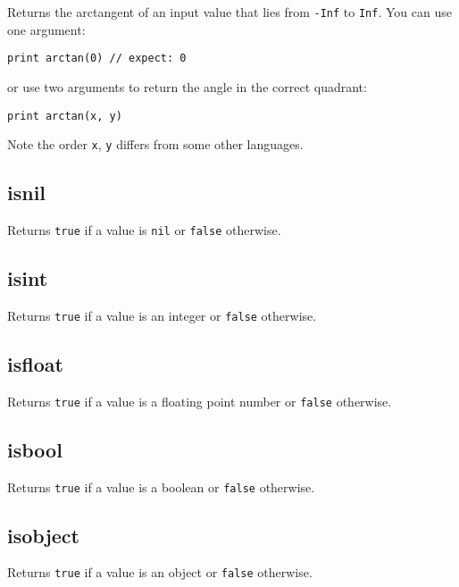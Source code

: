 Returns the arctangent of an input value that lies from \texttt{-Inf} to
\texttt{Inf}. You can use one argument:

\begin{lstlisting}
print arctan(0) // expect: 0
\end{lstlisting}

or use two arguments to return the angle in the correct quadrant:

\begin{lstlisting}
print arctan(x, y)
\end{lstlisting}

Note the order \texttt{x}, \texttt{y} differs from some other languages.

\hypertarget{isnil}{%
\subsection{isnil}\label{isnil}}

Returns \texttt{true} if a value is \texttt{nil} or \texttt{false}
otherwise.

\hypertarget{isint}{%
\subsection{isint}\label{isint}}

Returns \texttt{true} if a value is an integer or \texttt{false}
otherwise.

\hypertarget{isfloat}{%
\subsection{isfloat}\label{isfloat}}

Returns \texttt{true} if a value is a floating point number or
\texttt{false} otherwise.

\hypertarget{isbool}{%
\subsection{isbool}\label{isbool}}

Returns \texttt{true} if a value is a boolean or \texttt{false}
otherwise.

\hypertarget{isobject}{%
\subsection{isobject}\label{isobject}}

Returns \texttt{true} if a value is an object or \texttt{false}
otherwise.

